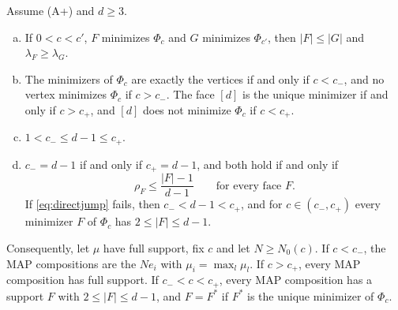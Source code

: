 \begin{proposition}\label{prop:thresholds}
Assume \textup{(A+)} and $d\ge3$.
\begin{enumerate}[(a)]
\item If $0<c<c'$, $F$ minimizes $\Phi_c$ and $G$ minimizes $\Phi_{c'}$,
then $\lvert F\rvert\le\lvert G\rvert$ and $\lambda_F\ge\lambda_G$.
\item The minimizers of $\Phi_c$ are exactly the vertices if and only if
$c<c_-$, and no vertex minimizes $\Phi_c$ if $c>c_-$. The face $[d]$ is the
unique minimizer if and only if $c>c_+$, and $[d]$ does not minimize $\Phi_c$
if $c<c_+$.
\item $1<c_-\le d-1\le c_+$.
\item $c_-=d-1$ if and only if $c_+=d-1$, and both hold if and only if
\begin{equation}\label{eq:directjump}
 \rho_F\le\frac{\lvert F\rvert-1}{d-1}\qquad\text{for every face } F.
\end{equation}
If \eqref{eq:directjump} fails, then $c_-<d-1<c_+$, and for
$c\in(c_-,c_+)$ every minimizer $F$ of $\Phi_c$ has
$2\le\lvert F\rvert\le d-1$.
\end{enumerate}
Consequently, let $\mu$ have full support, fix $c$ and let $N\ge N_0(c)$. If
$c<c_-$, the MAP compositions are the $Ne_i$ with $\mu_i=\max_l\mu_l$. If
$c>c_+$, every MAP composition has full support. If $c_-<c<c_+$, every MAP
composition has a support $F$ with $2\le\lvert F\rvert\le d-1$, and $F=F^*$
if $F^*$ is the unique minimizer of $\Phi_c$.
\end{proposition}

